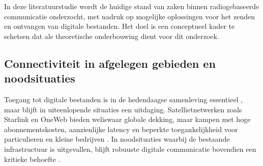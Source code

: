 





In deze literatuurstudie wordt de huidige stand van zaken binnen radiogebaseerde communicatie onderzocht, met nadruk op mogelijke oplossingen voor het zenden en ontvangen van digitale bestanden. Het doel is een conceptueel kader te schetsen dat als theoretische onderbouwing dient voor dit onderzoek.

\subsection{Connectiviteit in afgelegen gebieden en noodsituaties}

Toegang tot digitale bestanden is in de hedendaagse samenleving essentieel \autocite{MaritimeSurvey2022}, maar blijft in uiteenlopende situaties een uitdaging. Satellietnetwerken zoals Starlink en OneWeb bieden weliswaar globale dekking, maar kampen met hoge abonnementskosten, aanzienlijke latency en beperkte toegankelijkheid voor particulieren en kleine bedrijven \autocite{MaritimeSurvey2022}. In noodsituaties waarbij de bestaande infrastructuur is uitgevallen, blijft robuuste digitale communicatie bovendien een kritieke behoefte \autocite{WinlinkEmcomm}.

